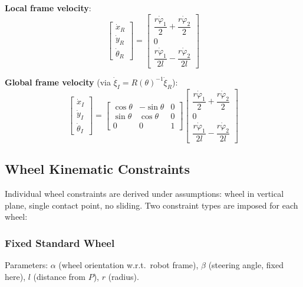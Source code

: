 \documentclass[11pt,a4paper]{article}
\theoremstyle{definition}
\theoremstyle{plain}
\theoremstyle{remark}
\begin{document}
\begin{tcolorbox}[colback=blue!5!white,colframe=blue!75!black,title=\textbf{Forward Kinematics: Differential Drive}]
\textbf{Local frame velocity}:
\[
\begin{bmatrix} \dot{x}_R \\ \dot{y}_R \\ \dot{\theta}_R \end{bmatrix}
= \begin{bmatrix} \dfrac{r\dot{\varphi}_1}{2} + \dfrac{r\dot{\varphi}_2}{2} \\[6pt] 0 \\[6pt] \dfrac{r\dot{\varphi}_1}{2l} - \dfrac{r\dot{\varphi}_2}{2l} \end{bmatrix}
\]

\textbf{Global frame velocity} (via $\dot{\xi}_I = R(\theta)^{-1}\dot{\xi}_R$):
\[
\begin{bmatrix} \dot{x}_I \\ \dot{y}_I \\ \dot{\theta}_I \end{bmatrix}
= \begin{bmatrix} \cos\theta & -\sin\theta & 0 \\ \sin\theta & \cos\theta & 0 \\ 0 & 0 & 1 \end{bmatrix}
\begin{bmatrix} \dfrac{r\dot{\varphi}_1}{2} + \dfrac{r\dot{\varphi}_2}{2} \\[6pt] 0 \\[6pt] \dfrac{r\dot{\varphi}_1}{2l} - \dfrac{r\dot{\varphi}_2}{2l} \end{bmatrix}
\]
\end{tcolorbox}

\subsection{Wheel Kinematic Constraints}

Individual wheel constraints are derived under assumptions: wheel in vertical plane, single contact point, no sliding. Two constraint types are imposed for each wheel:

\subsubsection*{Fixed Standard Wheel}

Parameters: $\alpha$ (wheel orientation w.r.t.\ robot frame), $\beta$ (steering angle, fixed here), $l$ (distance from $P$), $r$ (radius).
\end{document}
